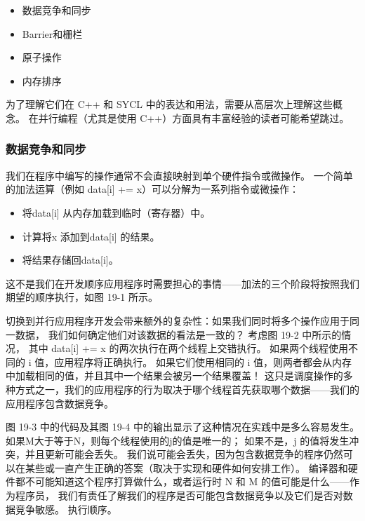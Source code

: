 \begin{itemize}
	\item 数据竞争和同步

	\item Barrier和栅栏

	\item 原子操作

	\item 内存排序
\end{itemize}

为了理解它们在 C++ 和 SYCL 中的表达和用法，需要从高层次上理解这些概念。 
在并行编程（尤其是使用 C++）方面具有丰富经验的读者可能希望跳过。

\subsubsection{数据竞争和同步}
我们在程序中编写的操作通常不会直接映射到单个硬件指令或微操作。 
一个简单的加法运算（例如 data[i] += x）可以分解为一系列指令或微操作：

\begin{itemize}
	\item 将data[i] 从内存加载到临时（寄存器）中。

	\item 计算将x 添加到data[i] 的结果。

	\item 将结果存储回data[i]。
\end{itemize}

这不是我们在开发顺序应用程序时需要担心的事情——加法的三个阶段将按照我们期望的顺序执行，如图 19-1 所示。

切换到并行应用程序开发会带来额外的复杂性：如果我们同时将多个操作应用于同一数据，
我们如何确定他们对该数据的看法是一致的？ 考虑图 19-2 中所示的情况，
其中 data[i] += x 的两次执行在两个线程上交错执行。 如果两个线程使用不同的 i 值，应用程序将正确执行。 
如果它们使用相同的 i 值，则两者都会从内存中加载相同的值，并且其中一个结果会被另一个结果覆盖！
 这只是调度操作的多种方式之一，我们的应用程序的行为取决于哪个线程首先获取哪个数据——我们的应用程序包含数据竞争。

图 19-3 中的代码及其图 19-4 中的输出显示了这种情况在实践中是多么容易发生。 
如果M大于等于N，则每个线程使用的j的值是唯一的； 如果不是，j 的值将发生冲突，并且更新可能会丢失。 
我们说可能会丢失，因为包含数据竞争的程序仍然可以在某些或一直产生正确的答案（取决于实现和硬件如何安排工作）。 
编译器和硬件都不可能知道这个程序打算做什么，或者运行时 N 和 M 的值可能是什么——作为程序员，
我们有责任了解我们的程序是否可能包含数据竞争以及它们是否对数据竞争敏感。 执行顺序。

